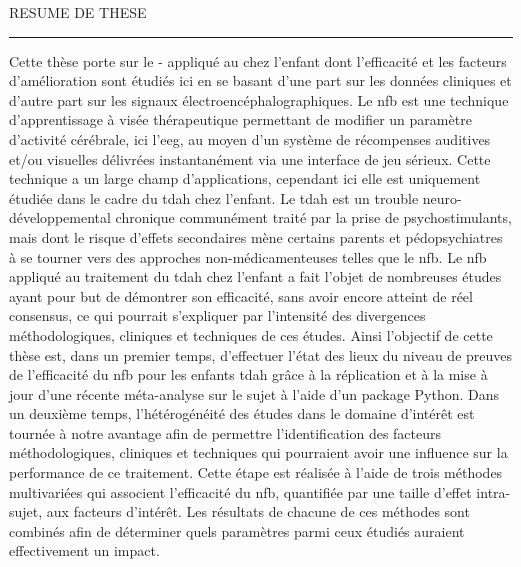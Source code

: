 
\begin{center}
\MakeUppercase{\LARGE{R}\Large{esume de these}} \\
\vspace{0mm}
\noindent\rule{16cm}{0.4pt}
\end{center}


Cette thèse porte sur le - appliqué au  chez l'enfant dont l'efficacité et les facteurs d'amélioration sont 
étudiés ici en se basant d'une part sur les données cliniques et d'autre part sur les signaux électroencéphalographiques. 
Le \gls{nfb} est une technique d'apprentissage à visée thérapeutique permettant 
de modifier un paramètre d'activité cérébrale, ici l'\gls{eeg}, au moyen d’un système de récompenses auditives et/ou visuelles 
délivrées instantanément via une interface de jeu sérieux. Cette technique a un large champ d'applications, cependant ici elle est uniquement étudiée 
dans le cadre du \gls{tdah} chez l'enfant. Le \gls{tdah} est un trouble neuro-développemental chronique communément traité par la prise de psychostimulants, 
mais dont le risque d'effets secondaires mène certains parents et pédopsychiatres à se tourner vers des approches non-médicamenteuses telles que le \gls{nfb}. 
Le \gls{nfb} appliqué au traitement du \gls{tdah} chez l'enfant a fait l’objet de nombreuses études ayant pour but de démontrer son efficacité, sans avoir encore atteint de réel
consensus, ce qui pourrait s'expliquer par l'intensité des divergences méthodologiques, cliniques et techniques de ces études. 
Ainsi l'objectif de cette thèse est, dans un premier temps, d'effectuer l'état des lieux du niveau de preuves de l'efficacité du \gls{nfb} pour les enfants \gls{tdah} grâce
à la réplication et à la mise à jour d'une récente méta-analyse sur le sujet à l'aide d'un package Python. Dans un 
deuxième temps, l'hétérogénéité des études dans le domaine d'intérêt est tournée à notre avantage afin de permettre 
l'identification des facteurs méthodologiques, cliniques et techniques qui pourraient avoir une influence sur la performance de ce traitement. Cette étape est réalisée
à l'aide de trois méthodes multivariées qui associent l'efficacité du \gls{nfb}, quantifiée par une taille d’effet intra-sujet, aux facteurs d'intérêt. 
Les résultats de chacune de ces méthodes sont combinés afin de déterminer quels paramètres parmi ceux étudiés auraient effectivement un impact. 
